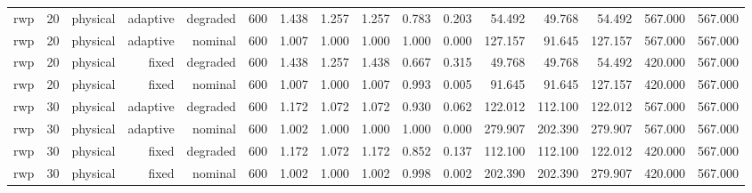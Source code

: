 \begin{tabular}{lrrrrrrrrrrrrrrr}
rwp & 20 & physical & adaptive & degraded & 600 & 1.438 & 1.257 & 1.257 & 0.783 & 0.203 & 54.492 & 49.768 & 54.492 & 567.000 & 567.000 \\
rwp & 20 & physical & adaptive & nominal & 600 & 1.007 & 1.000 & 1.000 & 1.000 & 0.000 & 127.157 & 91.645 & 127.157 & 567.000 & 567.000 \\
rwp & 20 & physical & fixed & degraded & 600 & 1.438 & 1.257 & 1.438 & 0.667 & 0.315 & 49.768 & 49.768 & 54.492 & 420.000 & 567.000 \\
rwp & 20 & physical & fixed & nominal & 600 & 1.007 & 1.000 & 1.007 & 0.993 & 0.005 & 91.645 & 91.645 & 127.157 & 420.000 & 567.000 \\
rwp & 30 & physical & adaptive & degraded & 600 & 1.172 & 1.072 & 1.072 & 0.930 & 0.062 & 122.012 & 112.100 & 122.012 & 567.000 & 567.000 \\
rwp & 30 & physical & adaptive & nominal & 600 & 1.002 & 1.000 & 1.000 & 1.000 & 0.000 & 279.907 & 202.390 & 279.907 & 567.000 & 567.000 \\
rwp & 30 & physical & fixed & degraded & 600 & 1.172 & 1.072 & 1.172 & 0.852 & 0.137 & 112.100 & 112.100 & 122.012 & 420.000 & 567.000 \\
rwp & 30 & physical & fixed & nominal & 600 & 1.002 & 1.000 & 1.002 & 0.998 & 0.002 & 202.390 & 202.390 & 279.907 & 420.000 & 567.000 \\
\bottomrule
\end{tabular}